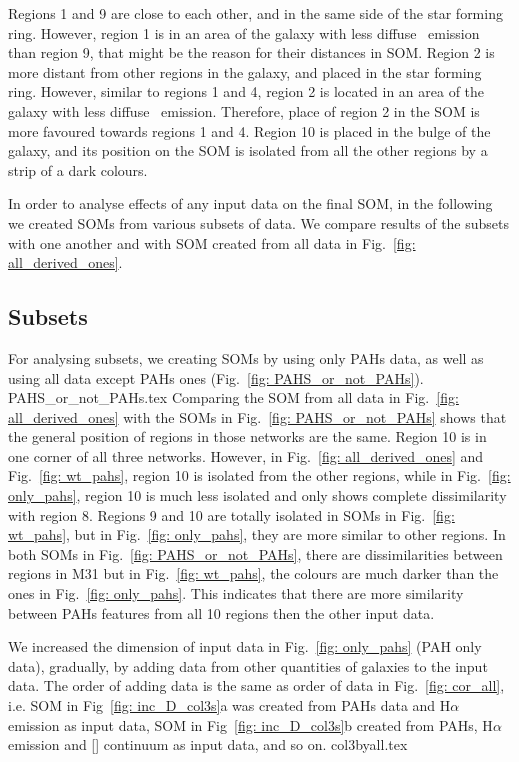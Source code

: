     Regions 1 and 9 are close to each other, and in the same side of the star forming ring. 
    However, region 1 is in an area of the galaxy with less diffuse \halpha~emission than region 9, that might be the reason for their distances in SOM.
    Region 2 is more distant from other regions in the galaxy, and placed in the star forming ring.
    However, similar to regions 1 and 4, region 2 is located in an area of the galaxy with less diffuse \halpha~emission.
    Therefore, place of region 2 in the SOM is more favoured towards regions 1 and 4. 
    Region 10 is placed in the bulge of the galaxy, and its position on the SOM is isolated from all the other regions by a strip of a dark colours. 
    
    In order to analyse effects of any input data on the final SOM, in the following we created SOMs from various subsets of data.
    We compare results of the subsets with one another and with SOM created from all data in Fig.~\ref{fig: all_derived_ones}.

    \subsection{Subsets}
    \label{sec: subsets}
            For analysing subsets, we creating SOMs by using only PAHs data, as well as using all data except PAHs ones (Fig.~\ref{fig: PAHS_or_not_PAHs}).
             {PAHS_or_not_PAHs.tex}
            Comparing the SOM from all data in Fig.~\ref{fig: all_derived_ones} with the SOMs in Fig.~\ref{fig: PAHS_or_not_PAHs} shows that the general position of regions in those networks are the same. 
            Region 10 is in one corner of all three networks.
            However, in Fig.~\ref{fig: all_derived_ones} and Fig.~\ref{fig: wt_pahs}, region 10 is isolated from the other regions, while in Fig.~\ref{fig: only_pahs}, region 10 is much less isolated and only shows complete dissimilarity with region 8.
            Regions 9 and 10 are totally isolated in SOMs in Fig.~\ref{fig: wt_pahs}, but in Fig.~\ref{fig: only_pahs}, they are more similar to other regions.
            In both SOMs in Fig.~\ref{fig: PAHS_or_not_PAHs}, there are dissimilarities between regions in M31 but in Fig.~\ref{fig: wt_pahs}, the colours are much darker than the ones in Fig.~\ref{fig: only_pahs}.
            This indicates that there are more similarity between PAHs features from all 10 regions then the other input data.
            
            We increased the dimension of input data in Fig.~\ref{fig: only_pahs} (PAH only data), gradually, by adding data from other quantities of galaxies to the input data. 
            The order of adding data is the same as order of data in Fig.~\ref{fig: cor_all}, i.e. SOM in Fig~\ref{fig: inc_D_col3s}a was created from PAHs data and H$\alpha$ emission as input data, SOM in Fig~\ref{fig: inc_D_col3s}b created from PAHs, H$\alpha$ emission and [\sii] continuum as input data, and so on. 
            {col3byall.tex}
            
